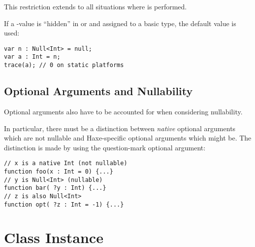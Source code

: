 This restriction extends to all situations where  is performed.


If a -value is ``hidden'' in  or  and assigned to a basic type, the default value is used:

\begin{lstlisting}
var n : Null<Int> = null;
var a : Int = n;
trace(a); // 0 on static platforms
\end{lstlisting}



\subsection{Optional Arguments and Nullability}
\label{types-nullability-optional-arguments}

Optional arguments also have to be accounted for when considering nullability.

In particular, there must be a distinction between \emph{native} optional arguments which are not nullable and Haxe-specific optional arguments which might be. The distinction is made by using the question-mark optional argument:

\begin{lstlisting}
// x is a native Int (not nullable)
function foo(x : Int = 0) {...}
// y is Null<Int> (nullable)
function bar( ?y : Int) {...}
// z is also Null<Int>
function opt( ?z : Int = -1) {...}
\end{lstlisting}


\section{Class Instance}
\label{types-class-instance}


